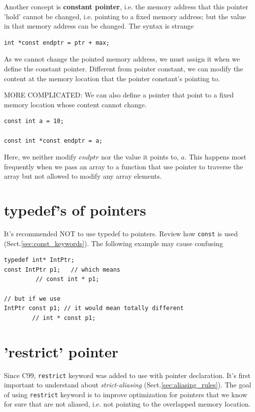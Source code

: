 Another concept is {\bf constant pointer}, i.e. the memory address that this
pointer 'hold' cannot be changed, i.e. pointing to a fixed memory address; but
the value in that memory address can be changed. The syntax is strange
\begin{lstlisting}
int *const endptr = ptr + max;
\end{lstlisting}
As we cannot change the pointed memory address, we must assign it when
we define the constant pointer. Different from pointer constant, we
can modify the content at the memory location that the pointer
constant's pointing to.

MORE COMPLICATED: We can also define a pointer that point to a fixed
memory location whose content cannot change.
\begin{lstlisting}
const int a = 10;

const int *const endptr = a;
\end{lstlisting}
Here, we neither modify $endptr$ nor the value it points to, $a$. This
happens most frequently when we pass an array to a function that use
pointer to traverse the array but not allowed to modify any array
elements.

\section{typedef's of pointers}
\label{sec:typedef_pointers}

It's recommended NOT to use typedef to pointers. Review how \verb!const! is used
(Sect.\ref{sec:const_keywords}). The following example may cause confusing

\begin{verbatim}
typedef int* IntPtr;
const IntPtr p1;   // which means
         // const int * p1;

// but if we use
IntPtr const p1; // it would mean totally different
        // int * const p1;         
\end{verbatim}

\section{'restrict' pointer}
\label{sec:pointer_restrict}

Since C99, \verb!restrict! keyword was added to use with pointer declaration.
It's first important to understand about {\it strict-aliasing}
(Sect.\ref{sec:aliasing_rules}). The goal of using \verb!restrict! keyword is to
improve optimization for pointers that we know for sure that are not aliased,
i.e. not pointing to the overlapped memory location.

